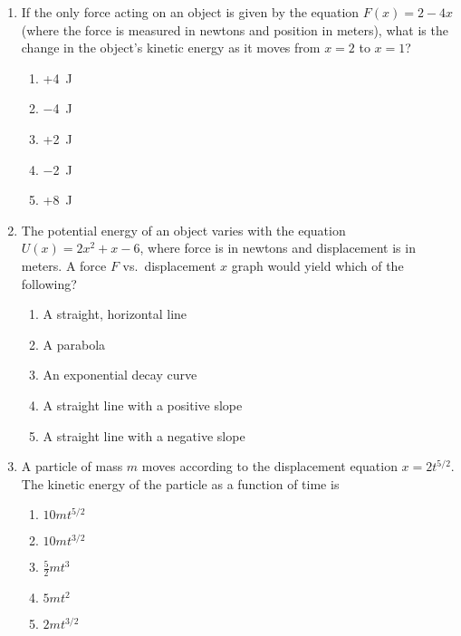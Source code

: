 \documentclass{../../../oss-classkick}
\begin{document}
\begin{multicols}{2}
\begin{enumerate}[leftmargin=18pt,resume]
  \item If the only force acting on an object is given by the equation
    $F(x)=2-4x$ (where the force is measured in newtons and position in meters),
    what is the change in the object's kinetic energy as it moves from $x=2$ to
    $x=1$?
    \begin{enumerate}[nosep,leftmargin=18pt,label=(\Alph*)]
    \item +\SI{4}{\joule}
    \item \SI{-4}{\joule}
    \item +\SI{2}{\joule}
    \item \SI{-2}{\joule}
    \item +\SI{8}{\joule}
    \end{enumerate}
    
  \item The potential energy of an object varies with the equation
    $U(x)=2x^2+x-6$, where force is in newtons and displacement is in meters. A
    force $F$ vs.\ displacement $x$ graph would yield which of the following?
    \begin{enumerate}[nosep,leftmargin=18pt,label=(\Alph*)]
    \item A straight, horizontal line
    \item A parabola
    \item An exponential decay curve
    \item A straight line with a positive slope
    \item A straight line with a negative slope
    \end{enumerate}
    \vspace{.7in}
    
  \item A particle of mass $m$ moves according to the displacement equation
    $x=2t^{5/2}$. The kinetic energy of the particle as a function of time is
    \begin{enumerate}[nosep,leftmargin=18pt,label=(\Alph*)]
    \item $10mt^{5/2}$
    \item $10mt^{3/2}$
    \item $\displaystyle\frac52mt^3$
    \item $5mt^2$
    \item $2mt^{3/2}$
    \end{enumerate}


\end{enumerate}
\end{multicols}
\end{document}
